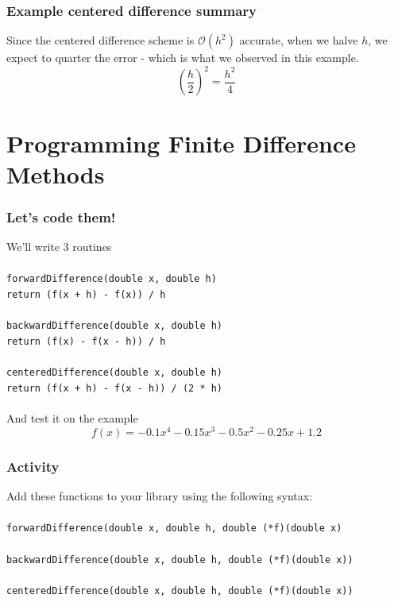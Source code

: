 \documentclass{if-beamer}
\begin{document}
\begin{frame}
	\frametitle{Example centered difference summary}
	Since the centered difference scheme is $\mathcal{O}(h^2)$ accurate, when we halve $h$, we expect to quarter the error - which is what we observed in this example.
	$$\left(\frac{h}{2}\right)^2 = \frac{h^2}{4} $$ 
\end{frame}

\section{Programming Finite Difference Methods}
\begin{frame}
	\frametitle{Let's code them!}
	We'll write 3 routines\\
	\texttt{ }\\
	\texttt{forwardDifference(double x, double h)}\\
	\texttt{\qquad return (f(x + h) - f(x)) / h}\\
	\texttt{ }\\
	\texttt{backwardDifference(double x, double h)}\\
	\texttt{\qquad return (f(x) - f(x - h)) / h}\\
	\texttt{ }\\
	\texttt{centeredDifference(double x, double h)}\\
	\texttt{\qquad return (f(x + h) - f(x - h)) / (2 * h)}\\
	\texttt{ }\\
	And test it on the example
	$$f(x) = -0.1x^4-0.15x^3-0.5x^2-0.25x+1.2 $$
\end{frame}

\begin{frame}
	\frametitle{Activity}
	Add these functions to your library using the following syntax:\\
	\texttt{ }\\
	\texttt{forwardDifference(double x, double h, double (*f)(double x)}\\
	\texttt{ }\\
	\texttt{backwardDifference(double x, double h, double (*f)(double x))}\\
	\texttt{ }\\
	\texttt{centeredDifference(double x, double h, double (*f)(double x))}\\
	\texttt{ }\\
\end{frame}
\end{document}
